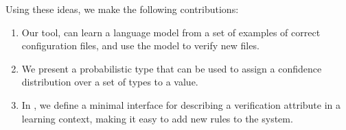 Using these ideas, we make the following contributions:

\begin{enumerate}

  \item Our tool, \app can learn a language model from a set of examples of correct configuration files, and use the model to verify new files.
  \item We present a probabilistic type that can be used to assign a confidence distribution over a set of types to a value.
  \item In \app, we define a minimal interface for describing a verification attribute in a learning context, making it easy to add new rules to the system.

\end{enumerate}
